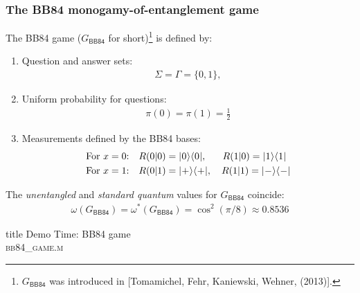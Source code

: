 \documentclass{beamer}
\def\BB84{\mathsf{BB84}}
\newcommand{\microspace}{\mspace{0.5mu}}
\newcommand{\ket}[1]{
  \lvert\microspace #1 \microspace \rangle}
\newcommand{\bra}[1]{
  \langle\microspace #1 \microspace \rvert}
\begin{document}
\begin{frame}
	\frametitle{The BB84 monogamy-of-entanglement game}
	The BB84 game ($G_{\BB84}$ for short)\footnote{$G_{\BB84}$ was introduced in [Tomamichel, Fehr, Kaniewski, Wehner, (2013)]. } is defined by: 
	\begin{enumerate}
		\item Question and answer sets:
			\begin{align*}
				\Sigma = \Gamma = \{0,1\},
			\end{align*}
		\item Uniform probability for questions:
			\begin{align*}
				\pi(0) = \pi(1) = \frac{1}{2}
			\end{align*}
		\item Measurements defined by the BB84 bases:
			\begin{align*}
				\textnormal{For $x = 0$:}& \quad R(0|0) = \ket{0}\bra{0}, \quad \ \ R(1|0) = \ket{1}\bra{1} \\ 
				\textnormal{For $x = 1$:}& \quad R(0|1) = \ket{+}\bra{+}, \quad R(1|1) = \ket{-}\bra{-}
			\end{align*}
	\end{enumerate}
	The \emph{unentangled} and \emph{standard quantum} values for $G_{\BB84}$ coincide:
	\begin{align*}
		\omega(G_{\BB84}) = \omega^*(G_{\BB84}) = \cos^2(\pi/8) \approx 0.8536
	\end{align*}
\end{frame}

\begin{frame} [noframenumbering]
  \vfill
  \centering
  \begin{beamercolorbox}[sep=8pt,center,shadow=true,rounded=true]{title}
    Demo Time: BB84 game \\ \textsc{bb84\_game.m}
  \end{beamercolorbox}
  \vfill
\end{frame}
\end{document}
